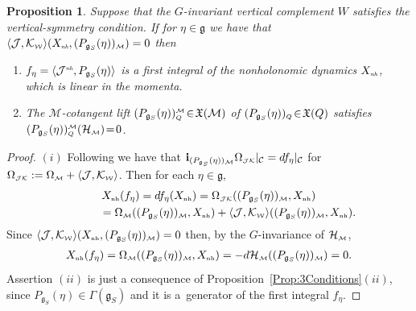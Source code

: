 \documentclass[pdftex]{sigma}
\numberwithin{equation}{section}
\newtheorem{Proposition}[Theorem]{Proposition}
 { \theoremstyle{definition}
\newtheorem{Definition}[Theorem]{Definition}
\newtheorem{Example}[Theorem]{Example}
\newtheorem{Remark}[Theorem]{Remark}
\newtheorem{Remarks}[Theorem]{Remarks} }
\def\W{\mathcal{W}}
\def\M{\mathcal{M}}
\def\J{\mathcal{J}}
\def\C{\mathcal{C}}
\def\Ham{\mathcal{H}}
\def\g{\mathfrak{g}}
\def\nh{{\mbox{\tiny{nh}}}}
\def\subW{{\mbox{\tiny{$\W$}}}}
\def\subM{{\mbox{\tiny{$\M$}}}}
\begin{document}
\begin{Proposition}\label{Prop:Conserved}
 Suppose that the $G$-invariant vertical complement $W$ satisfies the
 vertical-symmetry condition. If for $\eta\in \mathfrak{g}$ we have that
 $\langle \mathcal{J},\mathcal{K}_\subW\rangle (X_{\emph\nh},( P_{\mathfrak{g}_S}(\eta))_\subM )=0$
 then
 \begin{enumerate}\itemsep=0pt
  \item[$(i)$] $f_\eta = \langle \J^{\emph\nh}, P_{\mathfrak{g}_S}(\eta) \rangle$ is
  a first integral of the nonholonomic dynamics $X_{\emph\nh}$, which
  is linear in the momenta.
  \item[$(ii)$] The  $\M$-cotangent lift $( P_{\mathfrak{g}_S}(\eta))_{\mbox{\tiny{$Q$}}} ^{\subM} \!\in\! \mathfrak{X}(\M)$    of   $ (P_{\mathfrak{g}_S}(\eta))_{\mbox{\tiny{$Q$}}} \!\in\! \mathfrak{X}(Q)$
  satisfies $(P_{\mathfrak{g}_S}(\eta))_{\mbox{\tiny{$Q$}}} ^{\subM} (\Ham_\subM)\! =\! 0$.
 \end{enumerate}
\end{Proposition}

\begin{proof}
$(i)$ Following \cite[Theorem~6.5(ii)]{Paula} we have that
${\bf i}_{( P_{\mathfrak{g}_S}(\eta))_\subM} \Omega_{\mbox{\tiny{${\mathcal J} {\mathcal K}$}}} |_\C= df_\eta|_\C$  for  $\Omega_{\mbox{\tiny{${\mathcal J} {\mathcal K}$}}} := \Omega_\subM + \langle \mathcal{J},\mathcal{K}_\subW\rangle$.
Then for each $\eta \in \mathfrak{g}$,
\begin{gather*}
X_\nh (f_\eta) = df_\eta (X_\nh) = \Omega_{\mbox{\tiny{${\mathcal J} {\mathcal K}$}}}( (P_{\mathfrak{g}_S}(\eta) )_\subM , X_\nh) \\
\hphantom{X_\nh (f_\eta)}{} =  \Omega_\subM( (P_{\mathfrak{g}_S}(\eta) )_\subM , X_\nh) +  \langle \mathcal{J},\mathcal{K}_\subW\rangle ( (P_{\mathfrak{g}_S}(\eta) )_\subM , X_\nh ).
\end{gather*}
Since $\langle \mathcal{J},\mathcal{K}_\subW\rangle (X_{\nh},( P_{\mathfrak{g}_S}(\eta))_\subM ) = 0$ then,
by the $G$-invariance of $\Ham_\subM$,
\begin{gather*}
X_\nh (f_\eta) = \Omega_\subM((P_{\mathfrak{g}_S}(\eta) )_\subM,X_\nh) = - d\Ham_\subM ((P_{\mathfrak{g}_S}(\eta) )_\subM )=0.
\end{gather*}
Assertion $(ii)$ is just a consequence of Proposition~\ref{Prop:3Conditions}$(ii)$,
since $P_{\mathfrak{g}_S}(\eta)  \in \Gamma(\g_S)$ and it
is a~generator of the f\/irst integral $f_\eta$.
\end{proof}
\end{document}

